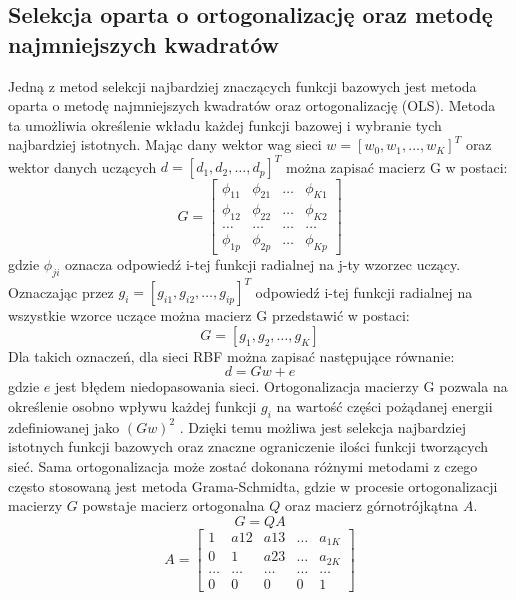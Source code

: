 \subsection{Selekcja oparta o ortogonalizację oraz metodę najmniejszych kwadratów}
Jedną z metod selekcji najbardziej znaczących funkcji bazowych jest metoda oparta o metodę najmniejszych kwadratów oraz ortogonalizację (OLS)\cite{Chen}. Metoda ta umożliwia określenie wkładu każdej funkcji bazowej i wybranie tych najbardziej istotnych. Mając dany wektor wag sieci $w = [w_0, w_1, \hdots, w_K]^T$ oraz wektor danych uczących $d = [d_1, d_2, \hdots, d_p]^T$ można zapisać macierz G w postaci:
\begin{equation}
G = \begin{bmatrix}
\phi_{11} & \phi_{21} & \hdots & \phi_{K1} \\
\phi_{12} & \phi_{22} & \hdots & \phi_{K2} \\
\hdots    & \hdots    & \hdots & \hdots    \\
\phi_{1p} & \phi_{2p} & \hdots & \phi_{Kp}
\end{bmatrix}
\end{equation}
gdzie $\phi_{ji}$ oznacza odpowiedź i-tej funkcji radialnej na j-ty wzorzec uczący. Oznaczając przez $g_i = [g_{i1}, g_{i2}, \hdots, g_{ip}]^T$ odpowiedź i-tej funkcji radialnej na wszystkie wzorce uczące można macierz G przedstawić w postaci:
\begin{equation}G = [g_1, g_2, \hdots, g_K] \end{equation}
Dla takich oznaczeń, dla sieci RBF można zapisać następujące równanie:
\begin{equation}
\label{wzor:ofr_rbf}
d = Gw + e\end
{equation}
gdzie $e$ jest błędem niedopasowania sieci. Ortogonalizacja macierzy G pozwala na określenie osobno wpływu każdej funkcji $g_i$ na wartość części pożądanej energii zdefiniowanej jako $(Gw)^2$ \cite{Osowski}. Dzięki temu możliwa jest selekcja najbardziej istotnych funkcji bazowych oraz znaczne ograniczenie ilości funkcji tworzących sieć. Sama ortogonalizacja może zostać dokonana różnymi metodami z czego często stosowaną jest metoda Grama-Schmidta, gdzie w procesie ortogonalizacji macierzy $G$ powstaje macierz ortogonalna $Q$ oraz macierz górnotrójkątna $A$.
\begin{equation}G = QA\end{equation}
\begin{equation}
A = \begin{bmatrix}
1      & a{12}  & a{13}  & \hdots & a_{1K} \\
0      & 1      & a{23}  & \hdots & a_{2K} \\
\hdots & \hdots & \hdots & \hdots & \hdots \\
0      & 0      & 0      & 0      & 1     
\end{bmatrix}
\end{equation}
